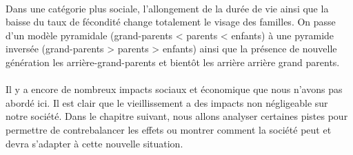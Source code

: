 \paragraph{}Dans une catégorie plus sociale, l’allongement de la durée de vie ainsi que la baisse du taux de fécondité change totalement le visage des familles. On passe d’un modèle pyramidale (grand-parents < parents < enfants) à une pyramide inversée  (grand-parents > parents > enfants) ainsi que la présence de nouvelle génération les arrière-grand-parents et bientôt les arrière arrière grand parents\citep[pp.13]{thesis}.

\paragraph{}Il y a encore de nombreux impacts sociaux et économique que nous n’avons pas abordé ici. Il est clair que le vieillissement a des impacts non négligeable sur notre société. Dans le chapitre suivant, nous allons analyser certaines pistes pour permettre de contrebalancer les effets ou montrer comment la société peut et devra s’adapter à cette nouvelle situation. 
 

 
